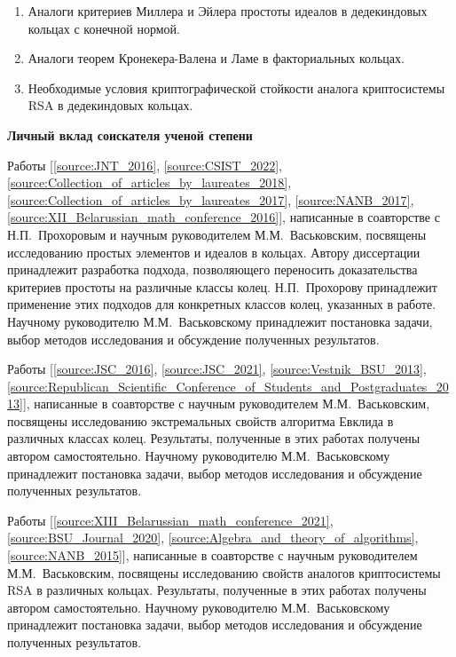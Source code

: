 \documentclass[_00_autoref.tex]{subfiles}
\begin{document}
\begin{enumerate}
    \item Аналоги критериев Миллера и Эйлера простоты идеалов в дедекиндовых кольцах с конечной нормой.
    
    \item Аналоги теорем Кронекера-Валена и Ламе в факториальных кольцах.
    
    \item Необходимые условия криптографической стойкости аналога криптосистемы RSA в дедекиндовых кольцах.
\end{enumerate}

\medskip
\centerline{\textbf{Личный вклад соискателя ученой степени}}

Работы [\ref{source:JNT_2016}, \ref{source:CSIST_2022}, \ref{source:Collection_of_articles_by_laureates_2018}, \ref{source:Collection_of_articles_by_laureates_2017}, \ref{source:NANB_2017}, \ref{source:XII_Belarussian_math_conference_2016}], написанные в соавторстве с Н.П.~Прохоровым и научным руководителем М.М.~Васьковским, посвящены исследованию простых элементов и идеалов в кольцах.
Автору диссертации принадлежит разработка подхода, позволяющего переносить доказательства критериев простоты на различные классы колец.
Н.П.~Прохорову принадлежит применение этих подходов для конкретных классов колец, указанных в работе.
Научному руководителю М.М.~Васьковскому принадлежит постановка задачи, выбор методов исследования и обсуждение полученных результатов.

Работы [\ref{source:JSC_2016}, \ref{source:JSC_2021}, \ref{source:Vestnik_BSU_2013}, \ref{source:Republican_Scientific_Conference_of_Students_and_Postgraduates_2013}], написанные в соавторстве с научным руководителем М.М.~Васьковским, посвящены исследованию экстремальных свойств алгоритма Евклида в различных  классах колец.
Результаты, полученные  в этих работах получены  автором самостоятельно.
Научному руководителю М.М.~Васьковскому принадлежит постановка задачи, выбор методов исследования и обсуждение полученных результатов.

Работы [\ref{source:XIII_Belarussian_math_conference_2021}, \ref{source:BSU_Journal_2020}, \ref{source:Algebra_and_theory_of_algorithms}, \ref{source:NANB_2015}], написанные в соавторстве с научным руководителем М.М.~Васьковским, посвящены исследованию свойств аналогов криптосистемы RSA в различных кольцах.
Результаты, полученные  в этих работах получены  автором самостоятельно.
Научному руководителю М.М.~Васьковскому принадлежит постановка задачи, выбор методов исследования и обсуждение полученных результатов.
\end{document}
